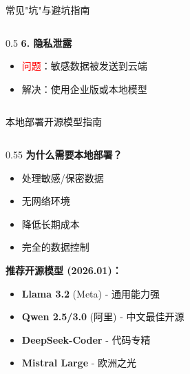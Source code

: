 \documentclass[aspectratio=169,11pt]{beamer}
\begin{document}
\begin{frame}{常见"坑"与避坑指南}
\begin{columns}
\begin{column}{0.5\textwidth}
            \vspace{0.2cm}
            \textbf{6. 隐私泄露}
            \begin{itemize}
                \item \textcolor{red}{问题}：敏感数据被发送到云端
                \item \textcolor{green!60!black}{解决}：使用企业版或本地模型
            \end{itemize}
        \end{column}
    \end{columns}
\end{frame}

\begin{frame}{本地部署开源模型指南}
    \begin{columns}
        \begin{column}{0.55\textwidth}
            \textbf{为什么需要本地部署？}
            \begin{itemize}
                \item 处理敏感/保密数据
                \item 无网络环境
                \item 降低长期成本
                \item 完全的数据控制
            \end{itemize}
            
            \vspace{0.3cm}
            \textbf{推荐开源模型 (2026.01)：}
            \begin{itemize}
                \item \textbf{Llama 3.2} (Meta) - 通用能力强
                \item \textbf{Qwen 2.5/3.0} (阿里) - 中文最佳开源
                \item \textbf{DeepSeek-Coder} - 代码专精
                \item \textbf{Mistral Large} - 欧洲之光
            \end{itemize}
            

\end{column}
\end{columns}
\end{frame}
\end{document}
